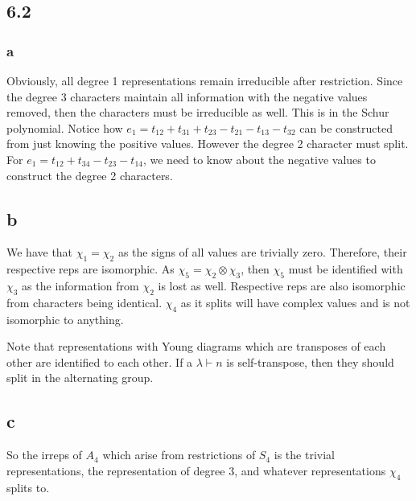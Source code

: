 \documentclass[]{article}
\begin{document}
\newpage
\subsection*{6.2}
\subsubsection*{a}
Obviously, all degree 1 representations remain irreducible after restriction. Since the degree $3$ characters maintain all information with the negative values removed, then the characters must be irreducible as well. This is in the Schur polynomial. Notice how $e_1 = t_{12} + t_{31} + t_{23} - t_{21} - t_{13} - t_{32}$ can be constructed from just knowing the positive values. However the degree 2 character must split. For $e_1 = t_{12} + t_{34} - t_{23} - t_{14}$, we need to know about the negative values to construct the degree 2 characters.
\subsection*{b}
We have that $\chi_1 = \chi_2$ as the signs of all values are trivially zero. Therefore, their respective reps are isomorphic. As $\chi_5 = \chi_2 \otimes \chi_3$, then $\chi_5$ must be identified with $\chi_3$ as the information from $\chi_2$ is lost as well. Respective reps are also isomorphic from characters being identical. $\chi_4$ as it splits will have complex values and is not isomorphic to anything. 

Note that representations with Young diagrams which are transposes of each other are identified to each other. If a $\lambda \vdash n$ is self-transpose, then they should split in the alternating group.
\subsection*{c}
So the irreps of $A_4$ which arise from restrictions of $S_4$ is the trivial representations, the representation of degree 3, and whatever representations $\chi_4$ splits to. 
\end{document}
